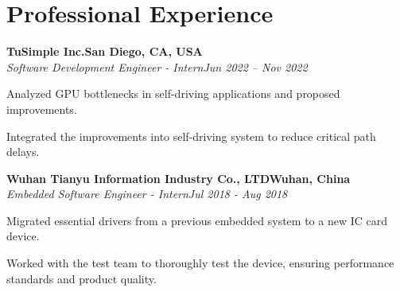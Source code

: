 \documentclass[letterpaper,10pt]{article}
\newcommand{\heading}[2]{
  \hspace{10pt}#1\hfill#2\\
}
\newcommand{\headingBf}[2]{
  \heading{\textbf{#1}}{\textbf{#2}}
}
\newcommand{\headingIt}[2]{
  \heading{\textit{#1}}{\textit{#2}}
}
\newenvironment{resume_list}{
  \vspace{-7pt}
  \begin{itemize}[itemsep=-2px, parsep=1pt, leftmargin=30pt]
}{
  \end{itemize}
}
\begin{document}
  \section{Professional Experience}

  \headingBf{TuSimple Inc.}{San Diego, CA, USA} %
  \headingIt{Software Development Engineer - Intern}{Jun 2022 -- Nov 2022}
    \begin{resume_list}
        \item Analyzed GPU bottlenecks in self-driving applications and proposed improvements.
        \item Integrated the improvements into self-driving system to reduce critical path delays.
    \end{resume_list}

  \headingBf{Wuhan Tianyu Information Industry Co., LTD}{Wuhan, China}
  \headingIt{Embedded Software Engineer - Intern}{Jul 2018 - Aug 2018}
  \begin{resume_list}
      \item Migrated essential drivers from a previous embedded system to a new IC card device.
      \item Worked with the test team to thoroughly test the device, ensuring performance standards and product quality.
  \end{resume_list}
\end{document}
